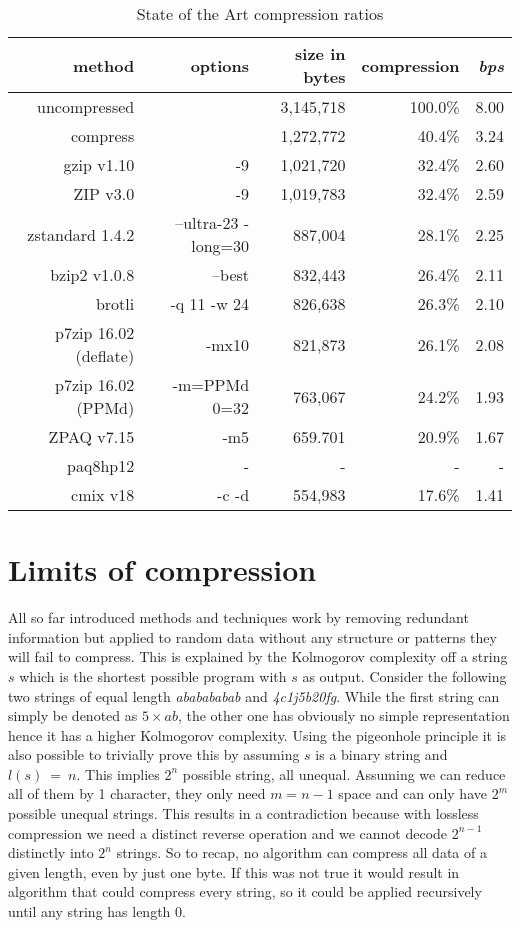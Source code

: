 {	\begin{table}[h]
		\begin{tabular}{r|r|r|r|r}
			method & options &  size in bytes & compression & \textit{bps}\\
			\hline
			uncompressed & & 3,145,718 & 100.0\% & 8.00\\
			compress & & 1,272,772 & 40.4\% & 3.24\\
			gzip v1.10 & -9 & 1,021,720 & 32.4\% & 2.60\\
			ZIP v3.0 &-9& 1,019,783 & 32.4\% & 2.59\\
			zstandard 1.4.2& --ultra-23 -long=30 & 887,004 & 28.1\% & 2.25\\
			bzip2 v1.0.8 & --best & 832,443 & 26.4\% & 2.11 \\
			brotli & -q 11 -w 24 & 826,638 & 26.3\%& 2.10\\
			p7zip 16.02 (deflate) & -mx10 & 821,873 & 26.1\% & 2.08\\
			p7zip 16.02 (PPMd) & -m=PPMd 0=32 & 763,067& 24.2\% & 1.93\\
			ZPAQ v7.15 & -m5 & 659.701 & 20.9\% & 1.67\\
			paq8hp12 & - & - & - & - \\ 
			cmix v18 & -c -d & 554,983 & 17.6\% & 1.41 		
		\end{tabular}
				\label{tab:t20 stat of the art}
			\caption{State of the Art compression ratios}
	\end{table}
}

\section{Limits of compression}
\label{ch:Principles of compression:sec:Limits of Conpression}
\par{
All so far introduced methods and techniques work by removing redundant information but applied to random data without any structure or patterns they will fail to compress. This is explained by the Kolmogorov complexity\cite{kolmogorov} off a string $s$ which is the shortest possible program with $s$ as output. Consider the following two strings of equal length \textit{ababababab} and \textit{4c1j5b20fg}. While the first string can simply be denoted as $5 \times ab$, the other one has obviously no simple representation hence it has a higher Kolmogorov complexity. Using the pigeonhole principle it is also possible to trivially prove this by assuming $s$ is a binary string and $l(s) \: = \: n$. This implies $2^n$ possible string, all unequal. Assuming we can reduce all of them by 1 character, they only need $m = n - 1$ space and can only have $2^m$ possible unequal strings. This results in a contradiction because with lossless compression we need a distinct reverse operation and we cannot decode $2^{n-1}$ distinctly into $2^n$ strings. So to recap, no algorithm can compress all data of a given length, even by just one byte. If this was not true it would result in algorithm that could compress every string, so it could be applied recursively until any string has length 0.
}
